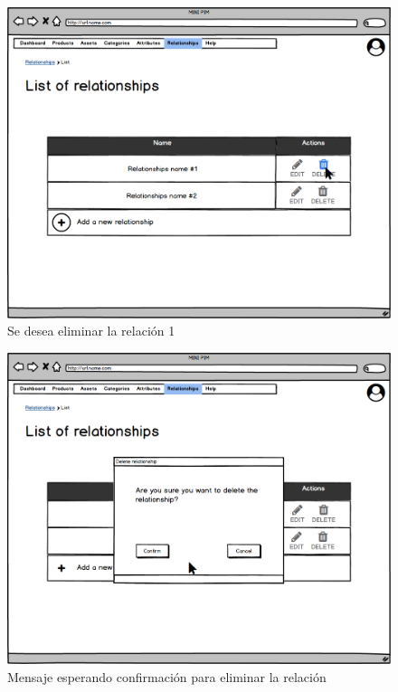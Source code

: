 \vspace{0.20cm}

\begin{figure}[H]
    \includegraphics[width=1\linewidth]{assets/mockups/RF5.4_1.png}
    \caption{Se desea eliminar la relación 1}
   \end{figure}
\vspace{1.0cm}

\begin{figure}[H]
    \includegraphics[width=1\linewidth]{assets/mockups/RF5.4_2.png}
    \caption{Mensaje esperando confirmación para eliminar la relación}
   \end{figure}
\vspace{1.0cm}

